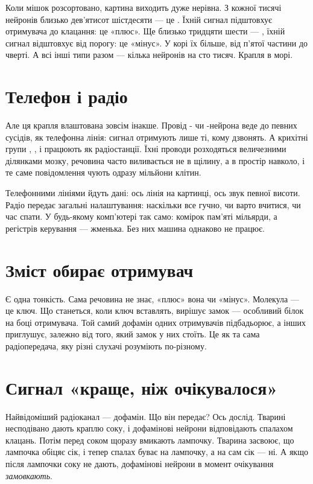 Коли мішок розсортовано, картина виходить дуже нерівна. З кожної тисячі нейронів близько дев'ятисот шістдесяти --- це . Їхній сигнал підштовхує отримувача до клацання: це «плюс». Ще близько тридцяти шести --- , їхній сигнал відштовхує від порогу: це «мінус». У корі їх більше, від п'ятої частини до чверті. А всі інші типи разом --- кілька нейронів на сто тисяч. Крапля в морі.

\section*{Телефон і радіо}

Але ця крапля влаштована зовсім інакше. Провід - чи -нейрона веде до певних сусідів, як телефонна лінія: сигнал отримують лише ті, кому дзвонять. А крихітні групи , ,  і  працюють як радіостанції. Їхні проводи розходяться величезними ділянками мозку, речовина часто виливається не в щілину, а в простір навколо, і те саме повідомлення чують одразу мільйони клітин.

Телефонними лініями йдуть дані: ось лінія на картинці, ось звук певної висоти. Радіо передає загальні налаштування: наскільки все гучно, чи варто вчитися, чи час спати. У будь-якому комп'ютері так само: комірок пам'яті мільярди, а регістрів керування --- жменька. Без них машина однаково не працює.

\section*{Зміст обирає отримувач}

Є одна тонкість. Сама речовина не знає, «плюс» вона чи «мінус». Молекула --- це ключ. Що станеться, коли ключ вставлять, вирішує замок --- особливий білок на боці отримувача. Той самий дофамін одних отримувачів підбадьорює, а інших приглушує, залежно від того, який замок у них стоїть. Це як та сама радіопередача, яку різні слухачі розуміють по-різному.

\section*{Сигнал «краще, ніж очікувалося»}

Найвідоміший радіоканал --- дофамін. Що він передає? Ось дослід. Тварині несподівано дають краплю соку, і дофамінові нейрони відповідають спалахом клацань. Потім перед соком щоразу вмикають лампочку. Тварина засвоює, що лампочка обіцяє сік, і тепер спалах буває на лампочку, а на сам сік --- ні. А якщо після лампочки соку не дають, дофамінові нейрони в момент очікування \emph{замовкають}.

